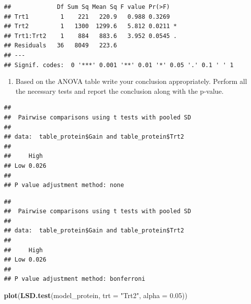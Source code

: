 \documentclass[11pt,]{article}
\newenvironment{Shaded}{\begin{snugshade}}{\end{snugshade}}
\newcommand{\DataTypeTok}[1]{\textcolor[rgb]{0.13,0.29,0.53}{#1}}
\newcommand{\FloatTok}[1]{\textcolor[rgb]{0.00,0.00,0.81}{#1}}
\newcommand{\KeywordTok}[1]{\textcolor[rgb]{0.13,0.29,0.53}{\textbf{#1}}}
\newcommand{\NormalTok}[1]{#1}
\newcommand{\OperatorTok}[1]{\textcolor[rgb]{0.81,0.36,0.00}{\textbf{#1}}}
\newcommand{\StringTok}[1]{\textcolor[rgb]{0.31,0.60,0.02}{#1}}
\providecommand{\tightlist}{%
\setlength{\itemsep}{0pt}\setlength{\parskip}{0pt}}
\begin{document}
\begin{verbatim}
##             Df Sum Sq Mean Sq F value Pr(>F)  
## Trt1         1    221   220.9   0.988 0.3269  
## Trt2         1   1300  1299.6   5.812 0.0211 *
## Trt1:Trt2    1    884   883.6   3.952 0.0545 .
## Residuals   36   8049   223.6                 
## ---
## Signif. codes:  0 '***' 0.001 '**' 0.01 '*' 0.05 '.' 0.1 ' ' 1
\end{verbatim}

\begin{enumerate}
\def\labelenumi{(\alph{enumi})}
\setcounter{enumi}{3}
\tightlist
\item
  Based on the ANOVA table write your conclusion appropriately. Perform
  all the necessary tests and report the conclusion along with the
  p-value.
\end{enumerate}

\begin{Shaded}
\end{Shaded}

\begin{verbatim}
## 
##  Pairwise comparisons using t tests with pooled SD 
## 
## data:  table_protein$Gain and table_protein$Trt2 
## 
##     High 
## Low 0.026
## 
## P value adjustment method: none
\end{verbatim}

\begin{Shaded}
\end{Shaded}

\begin{verbatim}
## 
##  Pairwise comparisons using t tests with pooled SD 
## 
## data:  table_protein$Gain and table_protein$Trt2 
## 
##     High 
## Low 0.026
## 
## P value adjustment method: bonferroni
\end{verbatim}

\begin{Shaded}
\begin{Highlighting}[]
\KeywordTok{plot}\NormalTok{(}\KeywordTok{LSD.test}\NormalTok{(model_protein, }\DataTypeTok{trt =} \StringTok{"Trt2"}\NormalTok{, }\DataTypeTok{alpha =} \FloatTok{0.05}\NormalTok{))}
\end{Highlighting}
\end{Shaded}
\end{document}
